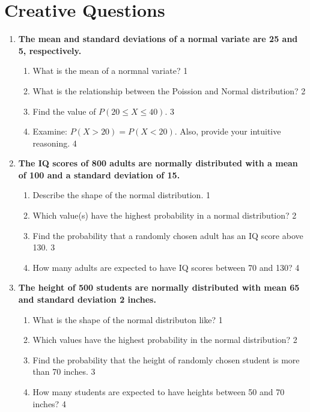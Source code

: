 \documentclass[a4paper,oneside, margin=1.4in]{book}
\begin{document}
\section{Creative Questions}
  \begin{enumerate}
 \item
  \textbf{The mean and standard deviations of a normal variate are 25 and 5, respectively. }
  
  \begin{enumerate}
    \item
	What is the mean of  a normnal variate? \hfill 1
    \item
	What is the relationship between the Poission and Normal distribution? \hfill 2
    \item  
	Find the value of $P(20 \le X \le 40).$ \hfill 3
    \item
	Examine: $P(X>20) = P(X<20)$. Also, provide your intuitive reasoning. \hfill 4
 \end{enumerate}
 
\item
\textbf{The IQ scores of 800 adults are normally distributed with a mean of 100 and a standard deviation of 15.}

\begin{enumerate}
    \item
    Describe the shape of the normal distribution. \hfill 1
    \item
    Which value(s) have the highest probability in a normal distribution? \hfill 2
    \item  
    Find the probability that a randomly chosen adult has an IQ score above 130. \hfill 3
    \item
    How many adults are expected to have IQ scores between 70 and 130? \hfill 4
\end{enumerate} 
 
 \item
  \textbf{The height of 500 students are normally distributed with mean 65 and standard deviation 2 inches. }

  \begin{enumerate}
    \item
	What is the shape of the normal distributon like? \hfill 1
    \item
	Which values have the highest probability in the normal distribution? \hfill 2
    \item  
	Find the probability that the height of randomly chosen student is more than 70 inches. \hfill 3
    \item
	How many students are expected to have heights between 50 and 70 inches? \hfill 4
  \end{enumerate}	
	  \end{enumerate}
\end{document}
